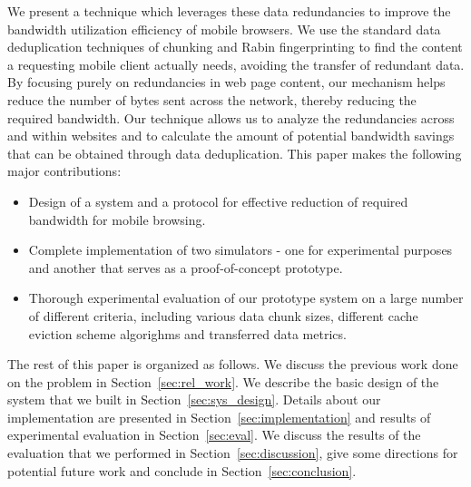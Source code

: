 We present a technique which leverages these data redundancies to improve the bandwidth utilization efficiency of mobile browsers. We use the standard data deduplication 
techniques of chunking \cite{manber,spring,lbfs} and Rabin fingerprinting \cite{rabin} to find the content a requesting mobile client actually needs, avoiding the transfer of redundant data. By focusing purely on redundancies in web 
page content, our mechanism helps reduce the number of bytes sent across the network, thereby reducing the required bandwidth. Our technique allows us to analyze 
the redundancies across and within websites and to calculate the amount of potential bandwidth savings that can be obtained through data deduplication. This paper 
makes the following major contributions:
\begin{itemize}
\item Design of a system and a protocol for effective reduction of required bandwidth for mobile browsing.
\item Complete implementation of two simulators - one for experimental purposes and another that serves as a proof-of-concept prototype.
\item Thorough experimental evaluation of our prototype system on a large number of different criteria, including various data chunk sizes, different cache eviction scheme
algorighms and transferred data metrics.
\end{itemize}

The rest of this paper is organized as follows. We discuss the previous work done on the problem in Section~\ref{sec:rel_work}. We describe the basic design of the 
system that we built in Section~\ref{sec:sys_design}. Details about our implementation are presented in Section~\ref{sec:implementation} 
and results of experimental evaluation in Section~\ref{sec:eval}. We discuss the results of the evaluation that we performed in Section~\ref{sec:discussion}, give some directions for potential future work and conclude in Section~\ref{sec:conclusion}.

